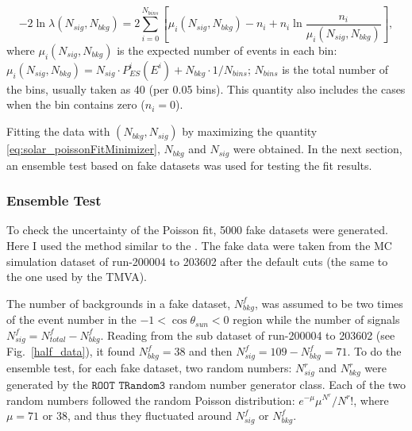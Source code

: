 \begin{equation}\label{eq:solar_poissonFitMinimizer}
-2\ln\mathcal \lambda(N_{sig},N_{bkg})
=2\sum_{i=0}^{N_{bins}}[\mu_i(N_{sig},N_{bkg})-n_i+n_i\ln\frac{n_i}{\mu_i(N_{sig},N_{bkg})}],
\end{equation}
where $\mu_i(N_{sig},N_{bkg})$ is the expected number of events in each bin: $\mu_i(N_{sig},N_{bkg})=N_{sig}\cdot P^i_{ES}(E^i)+N_{bkg}\cdot1/N_{bins}$; $N_{bins}$ is the total number of the bins, usually taken as 40 (per 0.05 bins). This quantity also includes the cases when the bin contains zero ($n_i=0$).

Fitting the data with $(N_{bkg},N_{sig})$ by maximizing the quantity \ref{eq:solar_poissonFitMinimizer}, $N_{bkg}$ and $N_{sig}$ were obtained. In the next section, an ensemble test based on fake datasets was used for testing the fit results.
%
%
\subsubsection{Ensemble Test}
To check the uncertainty of the Poisson fit, 5000 fake datasets were generated. Here I used the method similar to the \cite{leta}.
The fake data were taken from the MC simulation dataset of run-200004 to 203602 after the default cuts (the same to the one used by the TMVA). %

The number of backgrounds in a fake dataset, $N^f_{bkg}$, was assumed to be two times of the event number in the $-1<\cos\theta_{sun}<0$ region while the number of signals $N^f_{sig}=N^f_{total}-N^f_{bkg}$. Reading from the sub dataset of run-200004 to 203602 (see Fig.~\ref{half_data}), it found $N^f_{bkg}=38$ and then $N^f_{sig}=109-N^f_{bkg}=71$. To do the ensemble test, for each fake dataset, two random numbers: $N^r_{sig}$ and $N^r_{bkg}$ were generated by the $\texttt{ROOT TRandom3}$ random number generator class. Each of the two random numbers followed the random Poisson distribution: $e^{-\mu}\mu^{N^r}/N^r!$, where $\mu=71$ or $38$, and thus they fluctuated around $N^f_{sig}$ or $N^f_{bkg}$.

